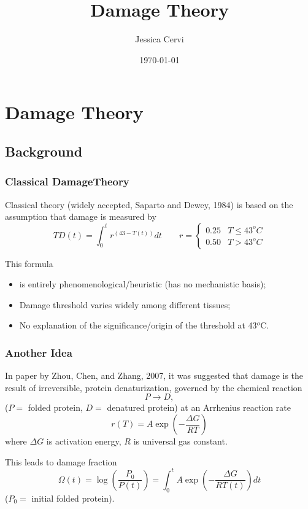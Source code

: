 \documentclass{beamer}
\title{Damage Theory}
\author{Jessica Cervi}
\date{\today}
\begin{document}
\begin{frame}
\maketitle
\end{frame}
 
\section{Damage Theory}
\subsection{Background}
\begin{frame}
\frametitle{Classical DamageTheory}
Classical theory (widely accepted, Saparto and Dewey, 1984) is based on the assumption that damage  is measured by 
\begin{equation*}
TD(t) = \int_0^tr^{(43-T(t))}dt \qquad r = \left\{\begin{array}{cc}0.25 & T\le43^oC\\0.50&T>43^oC\end{array}\right.
\end{equation*}

This formula 
\begin{itemize}
\item is entirely phenomenological/heuristic (has no mechanistic basis);
\item Damage threshold varies widely among different tissues;
\item No explanation of the significance/origin of the threshold at 43$^o$C.
\end{itemize}



\end{frame}

\begin{frame}
\frametitle{Another Idea}
In paper by  Zhou, Chen, and  Zhang, 2007, it was suggested that damage is the result of irreversible, protein denaturization, governed by the chemical reaction
\begin{equation*}
P\rightarrow D,
\end{equation*}
($P =$ folded protein, $D=$ denatured protein) at an Arrhenius reaction rate
\begin{equation*}
r(T) = A\exp(-\frac{\Delta G}{RT})
\end{equation*}
where $\Delta G$ is activation energy, $R$ is universal gas constant.

This leads to damage fraction
\begin{equation*}
\Omega(t) = \log(\frac{P_0}{P(t)}) = \int_0^tA\exp(-\frac{\Delta G}{RT(t)})dt
\end{equation*}
($P_0=$ initial folded protein).
 
\end{frame}
 
\end{document}
